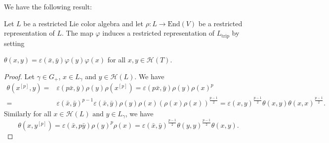 \documentclass[11pt, twoside]{article}
\begin{document}
We have the following result:


\begin{prop}
    Let $L$ be a restricted Lie color algebra and let $\rho: L\to \mathrm{End}(V)$ be a restricted representation of $L$. The map $\varphi$ induces a restricted representation of $L_{\mathrm{trip}} $ by setting \begin{center}
        $\theta(x,y)=\varepsilon(\bar{x},\bar{y})\varphi(y)\varphi(x) $ for all $x,y\in \mathcal{H}(T)$.\end{center}
\end{prop}

\begin{proof}
    Let $\gamma\in G_+ $, $x\in L_\gamma$ and $ y\in \mathcal{H}(L) $. We have \begin{align*}
        \theta(x^{[p]},y)=& \varepsilon(p\bar{x},\bar{y})\rho(y)\rho(x^{[p]})=\varepsilon(p\bar{x},\bar{y})\rho(y)\rho(x)^p \\ = & \varepsilon(\bar{x},\bar{y})^{p-1}\varepsilon(\bar{x},\bar{y})\rho(y)\rho(x)(\rho(x)\rho(x))^{\frac{p-1}{2}}=\varepsilon(x,y)^{\frac{p-1}{2}}\theta(x,y)\theta(x,x)^{\frac{p-1}{2}}. \end{align*} Similarly for all $x\in \mathcal{H}(L) \text{ and } y\in L_\gamma$, we have  $$\theta(x,y^{[p]})= \varepsilon(\bar{x},p\bar{y})\rho(y)^p\rho(x)=\varepsilon(\bar{x},\bar{y})^{\frac{p-1}{2}}\theta(y,y)^{\frac{p-1}{2}}\theta(x,y) .$$
\end{proof}

\end{document}
